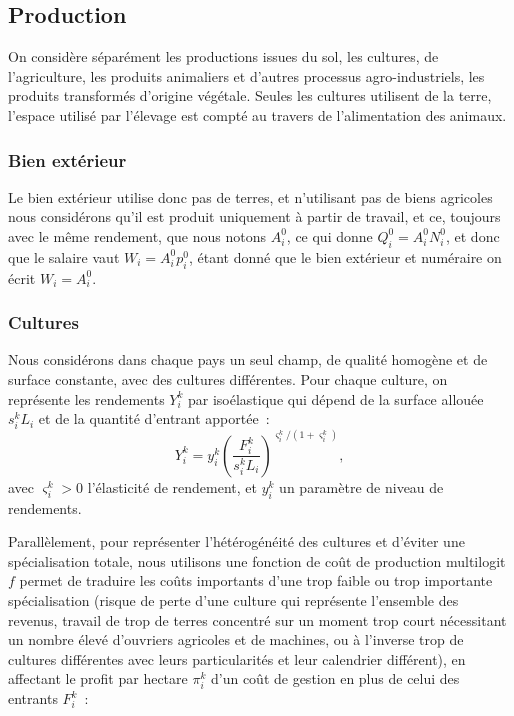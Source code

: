 \subsection{Production}
On considère séparément les productions issues du sol, les cultures, de l’agriculture, les produits animaliers et d’autres processus agro-industriels, les produits transformés d’origine végétale. Seules les cultures utilisent de la terre, l’espace utilisé par l’élevage est compté au travers de l’alimentation des animaux.

\subsubsection{Bien extérieur}
Le bien extérieur utilise donc pas de terres, et n’utilisant pas de biens agricoles nous considérons qu’il est produit uniquement à partir de travail, et ce, toujours avec le même rendement, que nous notons $A_i^0$, ce qui donne $Q_i^0 = A_i^0 N_i^0$, et donc que le salaire vaut $W_i = A_i^0 p_i^0$, étant donné que le bien extérieur et numéraire on écrit $W_i=A_i^0$.

\subsubsection{Cultures}

Nous considérons dans chaque pays un seul champ, de qualité homogène et de surface constante, avec des cultures différentes. Pour chaque culture, on représente les rendements $Y_i^k$ par isoélastique qui dépend de la surface allouée $s_i^k L_i$ et de la quantité d’entrant apportée~:
\begin{equation}\label{eq_pi}
	Y_i^k = y_i^k \left( \frac{F_i^k}{s_i^k L_i} \right) ^{\varsigma_i^k/(1+\varsigma_i^k)},
\end{equation}
avec $\varsigma_i^k > 0$ l’élasticité de rendement, et $y_i^k$ un paramètre de niveau de rendements.

Parallèlement, pour représenter l’hétérogénéité des cultures et d’éviter une spécialisation totale, nous utilisons une fonction de coût de production multilogit $f$ permet de traduire les coûts importants d’une trop faible ou trop importante spécialisation (risque de perte d’une culture qui représente l’ensemble des revenus, travail de trop de terres concentré sur un moment trop court nécessitant un nombre élevé d’ouvriers agricoles et de machines, ou à l’inverse trop de cultures différentes avec leurs particularités et leur calendrier différent), en affectant le profit par hectare $\pi_i^k$ d’un coût de gestion en plus de celui des entrants $F_i^k$~:

